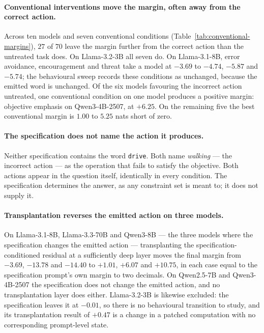 \paragraph{Conventional interventions move the margin, often away from the correct action.}
Across ten models and seven conventional conditions
(Table~\ref{tab:conventional-margins}), $27$ of $70$ leave the margin further from
the correct action than the untreated task does. On Llama-3.2-3B all seven do. On
Llama-3.1-8B, error avoidance, encouragement and threat take a model at $-3.69$ to
$-4.74$, $-5.87$ and $-5.74$; the behavioural sweep records these conditions as
unchanged, because the emitted word is unchanged. Of the six models favouring the
incorrect action untreated, one conventional condition on one model produces a
positive margin: objective emphasis on Qwen3-4B-2507, at $+6.25$. On the remaining
five the best conventional margin is $1.00$ to $5.25$ nats short of zero.

\paragraph{The specification does not name the action it produces.}
Neither specification contains the word \texttt{drive}. Both name \emph{walking} ---
the incorrect action --- as the operation that fails to satisfy the objective. Both
actions appear in the question itself, identically in every condition. The
specification determines the answer, as any constraint set is meant to; it does not
supply it.

\paragraph{Transplantation reverses the emitted action on three models.}
On Llama-3.1-8B, Llama-3.3-70B and Qwen3-8B --- the three models where the
specification changes the emitted action --- transplanting the
specification-conditioned residual at a sufficiently deep layer moves the final
margin from $-3.69$, $-13.78$ and $-14.40$ to $+1.01$, $+6.07$ and $+10.75$, in each
case equal to the specification prompt's own margin to two decimals. On Qwen2.5-7B
and Qwen3-4B-2507 the specification does not change the emitted action, and no
transplantation layer does either. Llama-3.2-3B is likewise excluded: the
specification leaves it at $-0.01$, so there is no behavioural transition to study,
and its transplantation result of $+0.47$ is a change in a patched computation with
no corresponding prompt-level state.

